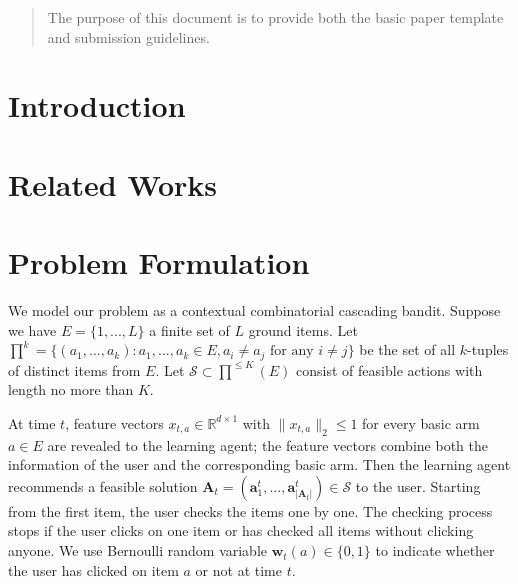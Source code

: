 \documentclass{article}
\newcommand{\RR}{\mathbb{R}}
\newcommand{\bA}{\mathbf{A}}
\newcommand{\ba}{\mathbf{a}}
\newcommand{\bw}{\mathbf{w}}
\newcommand{\cS}{\mathcal{S}}
\newcommand{\abs}[1]{\left| #1 \right|}
\newcommand{\norm}[1]{\| #1 \|}
\begin{document}
 
	
	
\begin{abstract} 
The purpose of this document is to provide both the basic paper template and submission guidelines.
\end{abstract} 
	
\section{Introduction}
	
\section{Related Works}
	
\section{Problem Formulation}

We model our problem as a contextual combinatorial cascading bandit. Suppose we have $E=\{1,...,L\}$ a finite set of $L$ ground items. Let $\prod^k=\{(a_1,...,a_k): a_1,...,a_k \in E, a_i \neq a_j \text{ for any } i \neq j\}$ be the set of all $k$-tuples of distinct items from $E$. Let $\cS \subset \prod^{\leq K}(E)$ consist of feasible actions with length no more than $K$.

At time $t$, feature vectors $x_{t,a} \in \RR^{d \times 1}$ with $\norm{x_{t,a}}_2 \leq 1$ for every basic arm $a \in E$ are revealed to the learning agent; the feature vectors combine both the information of the user and the corresponding basic arm. Then the learning agent recommends a feasible solution $\bA_t=(\ba_{1}^t,...,\ba_{\abs{\bA_t}}^t) \in \cS$ to the user. Starting from the first item, the user checks the items one by one. The checking process stops if the user clicks on one item or has checked all items without clicking anyone. We use Bernoulli random variable $\bw_{t}(a) \in \{0,1\}$ to indicate whether the user has clicked on item $a$ or not at time $t$. 
\end{document}
